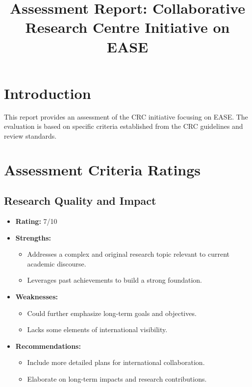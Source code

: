 \documentclass{article}
\begin{document}
\title{Assessment Report: Collaborative Research Centre Initiative on EASE}
\author{}
\date{}
\maketitle

\section{Introduction}
This report provides an assessment of the CRC initiative focusing on EASE. The evaluation is based on specific criteria established from the CRC guidelines and review standards.

\section{Assessment Criteria Ratings}

\subsection{Research Quality and Impact}
\begin{itemize}
    \item \textbf{Rating:} 7/10
    \item \textbf{Strengths:}
        \begin{itemize}
            \item Addresses a complex and original research topic relevant to current academic discourse.
            \item Leverages past achievements to build a strong foundation.
        \end{itemize}
    \item \textbf{Weaknesses:}
        \begin{itemize}
            \item Could further emphasize long-term goals and objectives.
            \item Lacks some elements of international visibility.
        \end{itemize}
    \item \textbf{Recommendations:}
        \begin{itemize}
            \item Include more detailed plans for international collaboration.
            \item Elaborate on long-term impacts and research contributions.
        \end{itemize}
\end{itemize}
\end{document}
